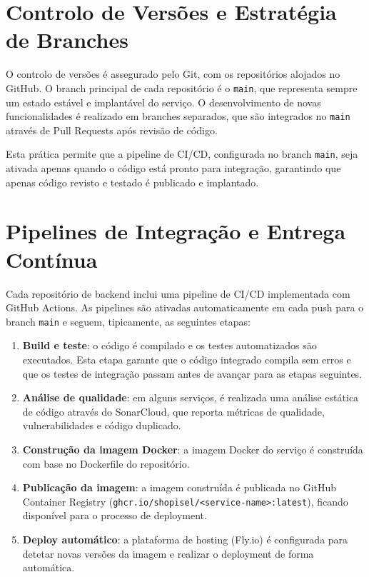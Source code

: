 \section{Controlo de Versões e Estratégia de Branches}
\label{sec:5.2}

O controlo de versões é assegurado pelo Git, com os repositórios alojados no GitHub. O branch principal de cada repositório é o \texttt{main}, que representa sempre um estado estável e implantável do serviço. O desenvolvimento de novas funcionalidades é realizado em branches separados, que são integrados no \texttt{main} através de Pull Requests após revisão de código.

Esta prática permite que a pipeline de \ac{CI/CD}, configurada no branch \texttt{main}, seja ativada apenas quando o código está pronto para integração, garantindo que apenas código revisto e testado é publicado e implantado.

\section{Pipelines de Integração e Entrega Contínua}
\label{sec:5.3}

Cada repositório de backend inclui uma pipeline de \ac{CI/CD} implementada com GitHub Actions. As pipelines são ativadas automaticamente em cada push para o branch \texttt{main} e seguem, tipicamente, as seguintes etapas:

\begin{enumerate}
    \item \textbf{Build e teste}: o código é compilado e os testes automatizados são executados. Esta etapa garante que o código integrado compila sem erros e que os testes de integração passam antes de avançar para as etapas seguintes.
    \item \textbf{Análise de qualidade}: em alguns serviços, é realizada uma análise estática de código através do SonarCloud, que reporta métricas de qualidade, vulnerabilidades e código duplicado.
    \item \textbf{Construção da imagem Docker}: a imagem Docker do serviço é construída com base no Dockerfile do repositório.
    \item \textbf{Publicação da imagem}: a imagem construída é publicada no GitHub Container Registry (\texttt{ghcr.io/shopisel/<service-name>:latest}), ficando disponível para o processo de deployment.
    \item \textbf{Deploy automático}: a plataforma de hosting (Fly.io) é configurada para detetar novas versões da imagem e realizar o deployment de forma automática.
\end{enumerate}

